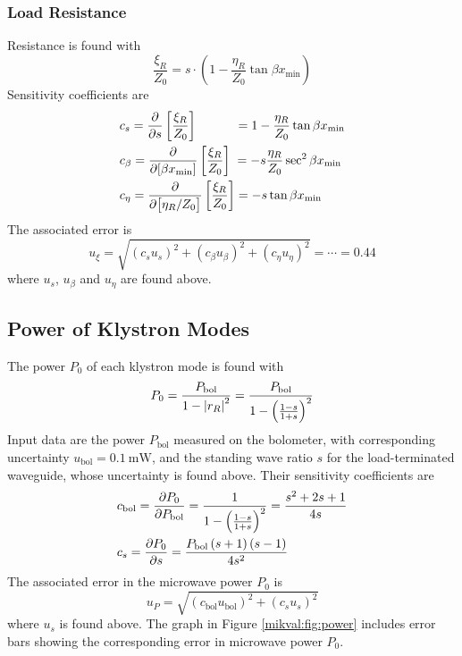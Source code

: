 \documentclass[11pt, a4paper]{article}
\begin{document}
\subsubsection{Load Resistance}
Resistance is found with
\begin{equation*}
	\frac{\xi_{R}}{Z_{0}} = s \cdot \left(1 - \frac{\eta_{R}}{Z_{0}}\tan \beta x_{\text{min}}\right)
\end{equation*}
Sensitivity coefficients are
\begin{align*}
	&c_{s} = \pdv{s}\left[\frac{\xi_{R}}{Z_{0}}\right] \hspace{11mm}= 1 - \frac{\eta_{R}}{Z_{0}}\tan \beta x_{\text{min}} \\
	&c_{\beta} = \pdv{[\beta x_{\text{min}}]}\left[\frac{\xi_{R}}{Z_{0}}\right]  \hspace{1mm} = -s\frac{\eta_{R}}{Z_{0}}\sec^{2} \beta x_{\text{min}}\\
	&c_{\eta} = \pdv{\big[\eta_{R}/Z_{0}\big]}\left[\frac{\xi_{R}}{Z_{0}}\right] = - s \tan \beta x_{\text{min}}
\end{align*}
The associated error is
\begin{equation*}
	u_{\xi} = \sqrt{(c_{s}u_{s})^{2} + (c_{\beta}u_{\beta})^{2} + (c_{\eta}u_{\eta})^{2}} = \cdots = 0.44
\end{equation*}
where $ u_{s} $, $ u_{\beta} $ and $ u_{\eta} $ are found above.

\subsection{Power of Klystron Modes}
The power $ P_{0} $ of each klystron mode is found with
\begin{equation*}
	P_{0} = \frac{P_{\text{bol}}}{1 - \abs{r_{R}}^{2}} = \frac{P_{\text{bol}}}{1 - \left(\frac{1 - s}{1 + s}\right )^{2}}
\end{equation*}
Input data are the power $ P_{\text{bol}} $ measured on the bolometer, with corresponding uncertainty $ u_{\text{bol}} = \SI{0.1}{\milli \watt} $, and the standing wave ratio $ s $ for the load-terminated waveguide, whose uncertainty is found above. Their sensitivity coefficients are
\begin{align*}
	&c_{\text{bol}} = \pdv{P_{0}}{P_{\text{bol}}} = \frac{1}{1 - \left(\frac{1 - s}{1 + s}\right )^{2}} = \frac{s^{2}+2s +1}{4s}\\
	&c_{s} = \pdv{P_{0}}{s} = \frac{P_{\text{bol}}\left(s+1\right)\left(s-1\right)}{4s^2}
\end{align*}
The associated error in the microwave power $ P_{0} $ is 
\begin{equation*}
	u_{P} = \sqrt{(c_{\text{bol}}u_{\text{bol}})^{2} + (c_{s}u_{s})^{2}}
\end{equation*}
where $ u_{s} $ is found above. The graph in Figure \ref{mikval:fig:power} includes error bars showing the corresponding error in microwave power $ P_{0} $.
\end{document}
